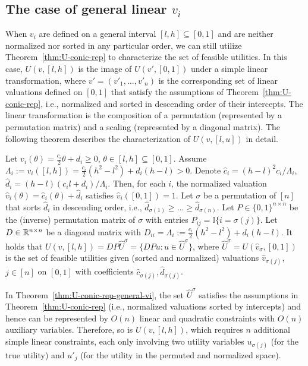 \subsection{The case of general linear $v_i$}
When $v_i$ are defined on a general interval $[l,h]\subseteq [0,1]$ and are neither normalized nor sorted in any particular order, we can still utilize Theorem~\ref{thm:U-conic-rep} to characterize the set of feasible utilities. 
In this case, $U(v, [l,h])$ is the image of $U(v', [0,1])$ under a simple linear transformation, where $v' = (v'_1, \dots, v'_n)$ is the corresponding set of linear valuations defined on $[0,1]$ that satisfy the assumptions of Theorem~\ref{thm:U-conic-rep}, i.e., normalized and sorted in descending order of their intercepts. 
The linear transformation is the composition of a permutation (represented by a permutation matrix) and a scaling (represented by a diagonal matrix). The following theorem describes the characterization of $U(v, [l,u])$ in detail.
\begin{theorem}
	Let $v_i(\theta) = \frac{c_i}{2}\theta+d_i \geq 0$, $\theta\in [l,h]\subseteq [0,1]$. 
	Assume 
	$\Lambda_i := v_i([l,h]) = \frac{c_i}{2}(h^2 - l^2) + d_i(h-l) > 0$.
	Denote $\hat{c}_i = (h-l)^2 c_i/ \Lambda_i$, $\hat{d}_i = (h-l) (c_i l + d_i) /\Lambda_i$. Then, for each $i$, the normalized valuation
	$ \hat{v}_i(\theta) = \hat{c}_i(\theta)+\hat{d}_i$ 
	satisfies $\hat{v}_i([0,1]) = 1$.
	Let $\sigma$ be a permutation of $[n]$ that sorts $\hat{d}_i$ in descending order, i.e., $\hat{d}_{\sigma(1)} \geq \dots \geq \hat{d}_{\sigma(n)}$. 
	Let $P\in \{0,1\}^{n\times n}$ be the (inverse) permutation matrix of $\sigma$ with entries $P_{ij} = \mathbb{I}\{i = \sigma(j)\}$. 
	Let $D\in \mathbb{R}^{n\times n}$ be a diagonal matrix with $D_{ii} = \Lambda_i := \frac{c_i}{2}(h^2-l^2) + d_i(h-l)$. It holds that
		 $ U(v, [l,h]) = D P \hat{U}^\sigma = \{ DP u: u\in \hat{U}^\sigma \}$,
	where $\hat{U}^\sigma = U(\hat{v}_{\sigma}, [0,1])$ is the set of feasible utilities given (sorted and normalized) valuations $\hat{v}_{\sigma(j)}$, $j \in [n]$ on $[0,1]$ with coefficients $\hat{c}_{\sigma(j)}, \hat{d}_{\sigma(j)}$.
	\label{thm:U-conic-rep-general-vi}
\end{theorem}
In Theorem~\ref{thm:U-conic-rep-general-vi}, the set $\hat{U}^\sigma$ satisfies the assumptions in Theorem~\ref{thm:U-conic-rep} (i.e., normalized valuations sorted by intercepts) and hence can be represented by $O(n)$ linear and quadratic constraints with $O(n)$ auxiliary variables. Therefore, so is $U(v, [l,h])$, which requires $n$ additional simple linear constraints, each only involving two utility variables $u_{\sigma(j)}$ (for the true utility) and $u'_j$ (for the utility in the permuted and normalized space).

